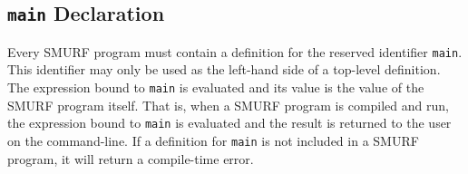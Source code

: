\subsection{\texttt{main} Declaration}

Every SMURF program must contain a definition for the reserved identifier \texttt{main}. This
identifier may only be used as the left-hand side of a top-level definition. The expression
bound to \texttt{main} is evaluated and its value is the value of the SMURF program itself.
That is, when a SMURF program is compiled and run, the expression bound to \texttt{main} is
evaluated and the result is returned to the user on the command-line. If a definition for
\texttt{main} is not included in a SMURF program, it will return a compile-time error.
